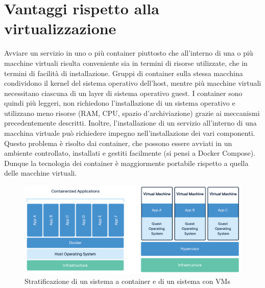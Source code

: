 \section{Vantaggi rispetto alla virtualizzazione}
Avviare un servizio in uno o più container piuttosto che all'interno di una o più macchine virtuali risulta conveniente sia in termini di risorse utilizzate, che in termini di facilità di installazione. Gruppi di container sulla stessa macchina condividono il kernel del sistema operativo dell'host, mentre più macchine virtuali necessitano ciascuna di un layer di sistema operativo guest. I container sono quindi più leggeri, non richiedono l'installazione di un sistema operativo e utilizzano meno risorse (RAM, CPU, spazio d'archiviazione) grazie ai meccanismi precedentemente descritti. Inoltre, l'installazione di un servizio all'interno di una macchina virtuale può richiedere impegno nell'installazione dei vari componenti. Questo problema è risolto dai container, che possono essere avviati in un ambiente controllato, installati e gestiti facilmente (si pensi a Docker Compose). Dunque la tecnologia dei container è maggiormente portabile rispetto a quella delle macchine virtuali.
\begin{figure}[h]
    \centering
    \includegraphics[width=\textwidth]{immagini/docker-containerized-and-vm-transparent-bg.png}
    \caption{Stratificazione di un sistema a container e di un sistema con VMs}
    \label{fig:container-vs-VM}
\end{figure}